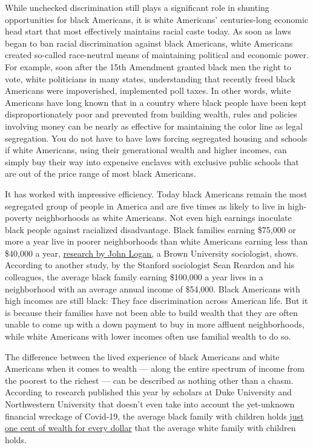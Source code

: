 While unchecked discrimination still plays a significant role in
shunting opportunities for black Americans, it is white Americans'
centuries-long economic head start that most effectively maintains
racial caste today. As soon as laws began to ban racial discrimination
against black Americans, white Americans created so-called race-neutral
means of maintaining political and economic power. For example, soon
after the 15th Amendment granted black men the right to vote, white
politicians in many states, understanding that recently freed black
Americans were impoverished, implemented poll taxes. In other words,
white Americans have long known that in a country where black people
have been kept disproportionately poor and prevented from building
wealth, rules and policies involving money can be nearly as effective
for maintaining the color line as legal segregation. You do not have to
have laws forcing segregated housing and schools if white Americans,
using their generational wealth and higher incomes, can simply buy their
way into expensive enclaves with exclusive public schools that are out
of the price range of most black Americans.

It has worked with impressive efficiency. Today black Americans remain
the most segregated group of people in America and are five times as
likely to live in high-poverty neighborhoods as white Americans. Not
even high earnings inoculate black people against racialized
disadvantage. Black families earning \$75,000 or more a year live in
poorer neighborhoods than white Americans earning less than \$40,000 a
year,
\href{https://s4.ad.brown.edu/projects/diversity/Data/Report/report0727.pdf}{research
by John Logan,} a Brown University sociologist, shows. According to
another study, by the Stanford sociologist Sean Reardon and his
colleagues, the average black family earning \$100,000 a year lives in a
neighborhood with an average annual income of \$54,000. Black Americans
with high incomes are still black: They face discrimination across
American life. But it is because their families have not been able to
build wealth that they are often unable to come up with a down payment
to buy in more affluent neighborhoods, while white Americans with lower
incomes often use familial wealth to do so.

The difference between the lived experience of black Americans and white
Americans when it comes to wealth --- along the entire spectrum of
income from the poorest to the richest --- can be described as nothing
other than a chasm. According to research published this year by
scholars at Duke University and Northwestern University that doesn't
even take into account the yet-unknown financial wreckage of Covid-19,
the average black family with children holds
\href{https://journals.sagepub.com/doi/full/10.1177/2378023120916616}{just
one cent of wealth for every dollar} that the average white family with
children holds.

